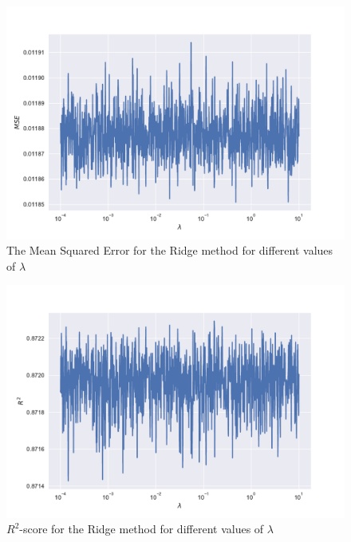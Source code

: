 \documentclass[a4paper,10pt,english]{article}
\begin{document}




\begin{figure}[H]
	\centering 
	\includegraphics[scale=0.6]{part_d_reg_MSE.pdf}
	\caption{The Mean Squared Error for the Ridge method for different values of $\lambda$}
	\label{part_d_MSE}
\end{figure}

\begin{figure}[H]
	\centering 
	\includegraphics[scale=0.6]{part_d_reg_R2.pdf}
	\caption{$R^2$-score for the Ridge method for different values of $\lambda$}
	\label{part_d_R2}
\end{figure}
\end{document}
